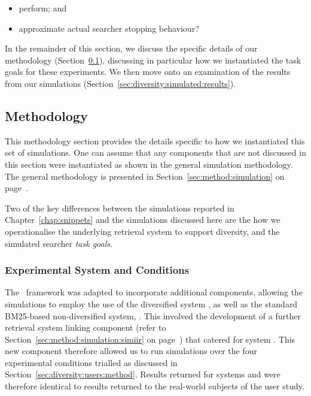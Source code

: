 \begin{itemize}
    \item{ perform; and}
    \item{ approximate actual searcher stopping behaviour?}
\end{itemize}

In the remainder of this section, we discuss the specific details of our methodology (Section~\ref{sec:diversity:simulated:method}), discussing in particular how we instantiated the task goals for these experiments. We then move onto an examination of the results from our simulations (Section~\ref{sec:diversity:simulated:results}).

\subsection{Methodology}\label{sec:diversity:simulated:method}
This methodology section provides the details specific to how we instantiated this set of simulations. One can assume that any components that are not discussed in this section were instantiated as shown in the general simulation methodology. The general methodology is presented in Section~\ref{sec:method:simulation} on page~\pageref{sec:method:simulation}.

Two of the key differences between the simulations reported in Chapter~\ref{chap:snippets} and the simulations discussed here are the how we operationalise the underlying retrieval system to support diversity, and the simulated searcher \emph{task goals}.

\subsubsection{Experimental System and Conditions}\label{sec:diversity:simulated:method:system}
The \simiir~framework was adapted to incorporate additional components, allowing the simulations to employ the use of the diversified system , as well as the standard BM25-based non-diversified system, . This involved the development of a further retrieval system linking component (refer to Section~\ref{sec:method:simulation:simiir} on page~\pageref{sec:method:simulation:simiir}) that catered for system . This new component therefore allowed us to run simulations over the four experimental conditions trialled as discussed in Section~\ref{sec:diversity:users:method}. Results returned for systems  and  were therefore identical to results returned to the real-world subjects of the user study.

